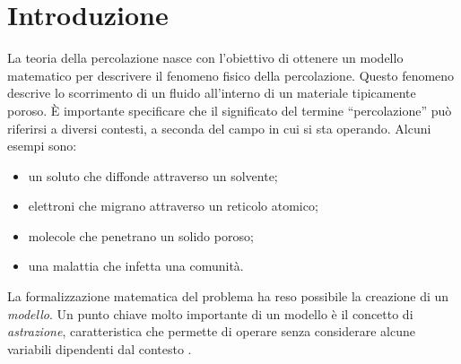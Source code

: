 \section{Introduzione}

La teoria della percolazione nasce con l'obiettivo di ottenere un modello matematico 
per descrivere il fenomeno fisico della percolazione. Questo fenomeno descrive lo scorrimento 
di un fluido all'interno di un materiale tipicamente poroso. È importante specificare 
che il significato del termine ``percolazione'' può riferirsi a diversi contesti, 
a seconda del campo in cui si sta operando. Alcuni esempi sono: 
\begin{itemize}
    \item un soluto che diffonde attraverso un solvente;
    \item elettroni che migrano attraverso un reticolo atomico;
    \item molecole che penetrano un solido poroso;
    \item una malattia che infetta una comunità.
\end{itemize}
La formalizzazione matematica del problema ha reso possibile la creazione 
di un \textit{modello}. Un punto chiave molto importante di un modello 
è il concetto di \textit{astrazione}, caratteristica che permette di
operare senza considerare alcune variabili dipendenti dal contesto \cite{broadbent}.